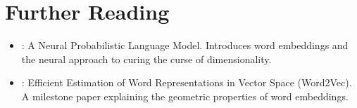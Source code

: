 \section{Further Reading}
\label{ch:08:sec:further}

\begin{itemize}
  \item \textcite{bengio2003}: A Neural Probabilistic Language Model. Introduces word embeddings and the neural approach to curing the curse of dimensionality.
  \item \textcite{mikolov2013}: Efficient Estimation of Word Representations in Vector Space (Word2Vec). A milestone paper explaining the geometric properties of word embeddings.
\end{itemize}
